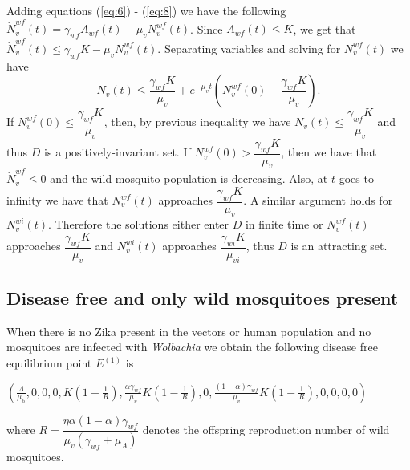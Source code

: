 \documentclass{ws-rv9x6}
\begin{document}
Adding equations (\ref{eq:6}) - (\ref{eq:8}) we have the following 
$\dot{N}_v^{wf}(t)=\gamma_{wf}A_{wf}(t)-\mu_vN_v^{wf}(t)$.
Since $A_{wf}(t) \leq K$, we get that $\dot{N}_v^{wf}(t)\leq \gamma_{wf}K-\mu_vN_v^{wf}(t)$. Separating variables and solving for $N_v^{wf}(t)$ we have
$$N_v(t)\leq \dfrac{\gamma_{wf}K}{\mu_v}+e^{-\mu_vt}\left(N_v^{wf}(0)-\dfrac{\gamma_{wf}K}{\mu_v}\right).$$ 
\noindent If $N_v^{wf}(0) \leq \dfrac{\gamma_{wf}K}{\mu_v}$, then, by previous inequality we have $N_v(t)\leq \dfrac{\gamma_{wf}K}{\mu_v}$ and thus $D$ is a positively-invariant set. If $N_v^{wf}(0) > \dfrac{\gamma_{wf}K}{\mu_v}$, then we have that $\dot{N}_v^{wf}\leq 0$ and the wild mosquito population is decreasing. Also, at $t$ goes to infinity we have that $N_v^{wf}(t)$ approaches $\dfrac{\gamma_{wf}K}{\mu_v}$. A similar argument holds for $N_v^{wi}(t)$. Therefore the solutions either enter $D$ in finite time or $N_v^{wf}(t)$ approaches $\dfrac{\gamma_{wf}K}{\mu_v}$ and $N_v^{wi}(t)$ approaches $\dfrac{\gamma_{wi}K}{\mu_{vi}}$,  thus $D$ is an attracting set. 

\subsection{Disease free and only wild mosquitoes present}
When there is no Zika present in the vectors or human population and no  mosquitoes are infected with \textit{Wolbachia} we obtain the following disease free equilibrium point $E^{(1)}$ is

\noindent $\left(\frac{\Lambda}{\mu_h},0,0,0,K\left(1-\frac{1}{R}\right),\frac{\alpha\gamma_{wf}}{\mu_v}K\left(1-\frac{1}{R}\right),0,\frac{(1-\alpha)\gamma_{wf}}{\mu_v}K\left(1-\frac{1}{R}\right),0,0,0,0\right)$ 

\noindent where $R=\dfrac{\eta \alpha (1-\alpha)\gamma_{wf}}{\mu_v (\gamma_{wf}+\mu_A)}$ denotes the offspring reproduction number of wild mosquitoes.
\end{document}
